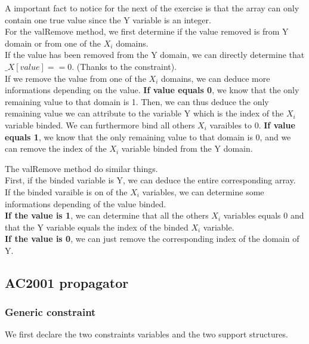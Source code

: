 \documentclass[a4paper ,12pt,french]{article}
\begin{document}
A important fact to notice for the next of the exercise is that the array can only contain one true value since the Y variable is an integer.\\

For the valRemove method, we first determine if the value removed is from Y domain or from one of the $X_i$ domains.\\
If the value has been removed  from the Y domain, we can directly determine that $\_X[value] == 0$. (Thanks to the constraint).\\
If we remove the value from one of the $X_i$ domains, we can deduce more informations depending on the value. \textbf{If value equals 0}, we know that the only remaining value to that domain is 1. Then, we can thus deduce the only remaining value we can attribute to the variable Y which is the index of the $X_i$ variable binded. We can furthermore bind all others $X_i$ varaibles to 0.  \textbf{If value equals 1}, we know that the only remaining value to that domain is 0, and we can remove the index of the $X_i$ variable binded from the Y domain.



The valRemove method do similar things.\\
First, if the binded variable is Y, we can deduce the entire corresponding array.\\
If the binded varaible is on of the $X_i$ variables, we can determine some informations depending of the value binded.\\
\textbf{If the value is 1}, we can determine that all the others $X_i$ variables equals 0 and that the Y variable equals the index of the binded $X_i$ variable. \\ \textbf{If the value is 0}, we can just remove the corresponding index of the domain of Y.


\subsection{AC2001 propagator}


\subsubsection{Generic constraint}
We first declare the two constraints variables and the two support structures.

\end{document}
